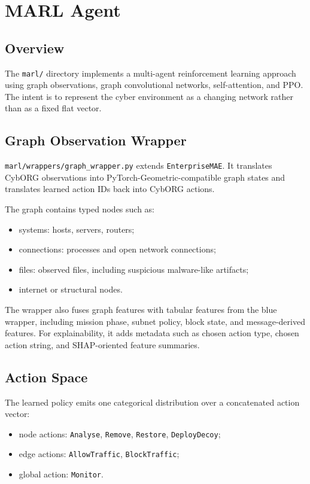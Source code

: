 \section{MARL Agent}

\subsection{Overview}

The \texttt{marl/} directory implements a multi-agent reinforcement learning approach using graph observations, graph convolutional networks, self-attention, and PPO. The intent is to represent the cyber environment as a changing network rather than as a fixed flat vector.

\subsection{Graph Observation Wrapper}

\texttt{marl/wrappers/graph\_wrapper.py} extends \texttt{EnterpriseMAE}. It translates CybORG observations into PyTorch-Geometric-compatible graph states and translates learned action IDs back into CybORG actions.

The graph contains typed nodes such as:
\begin{itemize}
  \item systems: hosts, servers, routers;
  \item connections: processes and open network connections;
  \item files: observed files, including suspicious malware-like artifacts;
  \item internet or structural nodes.
\end{itemize}

The wrapper also fuses graph features with tabular features from the blue wrapper, including mission phase, subnet policy, block state, and message-derived features. For explainability, it adds metadata such as chosen action type, chosen action string, and SHAP-oriented feature summaries.

\subsection{Action Space}

The learned policy emits one categorical distribution over a concatenated action vector:

\begin{itemize}
  \item node actions: \texttt{Analyse}, \texttt{Remove}, \texttt{Restore}, \texttt{DeployDecoy};
  \item edge actions: \texttt{AllowTraffic}, \texttt{BlockTraffic};
  \item global action: \texttt{Monitor}.
\end{itemize}

